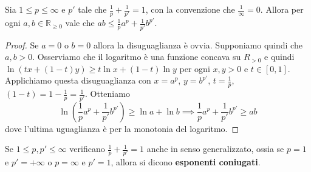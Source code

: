 \begin{proposition}\label{prp:Young}
    Sia \(1 \le p \le \infty\) e \(p'\) tale che \(\frac{1}{p} + \frac{1}{p'} =
    1\), con la convenzione che \(\frac{1}{\infty} = 0\). Allora per ogni \(a,
    b \in \mathbb{R}_{\ge 0} \) vale che \(ab \le \frac{1}{p} a^{p}
    +\frac{1}{p'} b^{p'}\).
\end{proposition}
\begin{proof}
    Se \(a=0\) o \(b=0\) allora la disuguaglianza è ovvia. Supponiamo quindi che
    \(a, b > 0\). Osserviamo che il logaritmo è una funzione concava su \(R_{>0}
    \) e quindi \(\ln(tx + (1-t)y) \ge t \ln x + (1-t) \ln y\) per ogni \(x, y >
    0\) e \(t \in [0, 1]\). Applichiamo questa disuguaglianza con \(x = a^{p}\),
    \(y = b^{p'}\), \(t = \frac{1}{p}\), \((1-t) = 1 - \frac{1}{p} =
    \frac{1}{p'}\). Otteniamo
    \[
        \ln\left(\frac{1}{p} a^{p} + \frac{1}{p'} b^{p'}\right) \ge \ln a + \ln b \implies
        \frac{1}{p} a^{p} + \frac{1}{p'} b^{p'} \ge ab
    \]
    dove l'ultima uguaglianza è per la monotonia del logaritmo.
\end{proof}

\begin{definition}
\label{def:coniugati}
    Se \(1 \le p, p' \le \infty\) verificano \(\frac{1}{p} + \frac{1}{p'} = 1\)
    anche in senso generalizzato, ossia se \(p = 1\) e \(p' = +\infty\) o \(p =
    \infty \) e \(p' = 1\), allora si dicono \textbf{esponenti coniugati}.
\end{definition}

